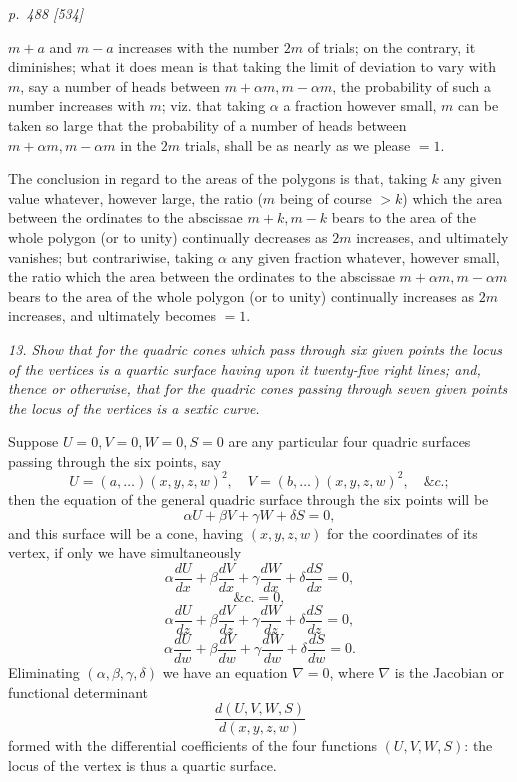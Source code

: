 \documentclass[11pt,a4paper]{article}
\theoremstyle{plain}
\theoremstyle{definition}
\newcommand{\sect}[1]{\medskip\noindent\textit{#1}}
\begin{document}
\bigskip
\textit{p.~488 [534]}
\smallskip

\noindent
$m+a$ and $m-a$ increases with the number $2m$ of trials; on the contrary, it
diminishes; what it does mean is that taking the limit of deviation to vary with $m$,
say a number of heads between $m+\alpha m,m-\alpha m$, the probability of such a
number increases with $m$; viz. that taking $\alpha$ a fraction however small, $m$ can
be taken so large that the probability of a number of heads between
$m+\alpha m,m-\alpha m$ in the $2m$ trials, shall be as nearly as we please $=1$.

The conclusion in regard to the areas of the polygons is that, taking $k$ any given
value whatever, however large, the ratio ($m$ being of course $>k$) which the area
between the ordinates to the abscissae $m+k,m-k$ bears to the area of the whole
polygon (or to unity) continually decreases as $2m$ increases, and ultimately vanishes;
but contrariwise, taking $\alpha$ any given fraction whatever, however small, the ratio
which the area between the ordinates to the abscissae $m+\alpha m,m-\alpha m$ bears
to the area of the whole polygon (or to unity) continually increases as $2m$ increases,
and ultimately becomes $=1$.

\sect{13. Show that for the quadric cones which pass through six given points the
locus of the vertices is a quartic surface having upon it twenty-five right lines; and,
thence or otherwise, that for the quadric cones passing through seven given points
the locus of the vertices is a sextic curve.}

Suppose $U=0,V=0,W=0,S=0$ are any particular four quadric surfaces passing
through the six points, say
\[
        U=(a,\ldots)(x,y,z,w)^2,\quad
        V=(b,\ldots)(x,y,z,w)^2,\quad \&c.;
\]
then the equation of the general quadric surface through the six points will be
\[
        \alpha U+\beta V+\gamma W+\delta S=0,
\]
and this surface will be a cone, having $(x,y,z,w)$ for the coordinates of its
vertex, if only we have simultaneously
\[
\alpha\frac{dU}{dx}+\beta\frac{dV}{dx}+\gamma\frac{dW}{dx}
+\delta\frac{dS}{dx}=0,
\]
\[
        \&c.=0,
\]
\[
\alpha\frac{dU}{dz}+\beta\frac{dV}{dz}+\gamma\frac{dW}{dz}
+\delta\frac{dS}{dz}=0,
\]
\[
\alpha\frac{dU}{dw}+\beta\frac{dV}{dw}+\gamma\frac{dW}{dw}
+\delta\frac{dS}{dw}=0.
\]
Eliminating $(\alpha,\beta,\gamma,\delta)$ we have an equation $\nabla=0$, where
$\nabla$ is the Jacobian or functional determinant
\[
        \frac{d(U,V,W,S)}{d(x,y,z,w)}
\]
formed with the differential coefficients of the four functions $(U,V,W,S)$: the
locus of the vertex is thus a quartic surface.
\end{document}

